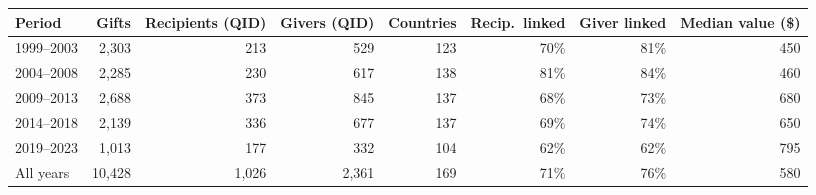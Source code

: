 \begin{tabular}{lrrrrrrr}
\toprule
Period & Gifts & Recipients (QID) & Givers (QID) & Countries & Recip.\ linked & Giver linked & Median value (\$) \\
\midrule
1999--2003 & 2,303 & 213 & 529 & 123 & 70\% & 81\% & 450 \\
2004--2008 & 2,285 & 230 & 617 & 138 & 81\% & 84\% & 460 \\
2009--2013 & 2,688 & 373 & 845 & 137 & 68\% & 73\% & 680 \\
2014--2018 & 2,139 & 336 & 677 & 137 & 69\% & 74\% & 650 \\
2019--2023 & 1,013 & 177 & 332 & 104 & 62\% & 62\% & 795 \\
All years & 10,428 & 1,026 & 2,361 & 169 & 71\% & 76\% & 580 \\
\bottomrule
\end{tabular}
